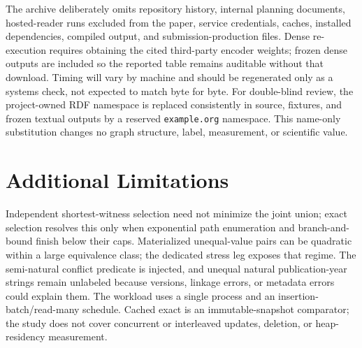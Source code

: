 \documentclass[letterpaper]{article}
\begin{document}
The archive deliberately omits repository history, internal planning
documents, hosted-reader runs excluded from the paper, service credentials,
caches, installed dependencies, compiled output, and submission-production
files.  Dense re-execution requires obtaining the cited third-party encoder
weights; frozen dense outputs are included so the reported table remains
auditable without that download.  Timing will vary by machine and should be
regenerated only as a systems check, not expected to match byte for byte.
For double-blind review, the project-owned RDF namespace is replaced
consistently in source, fixtures, and frozen textual outputs by a reserved
\texttt{example.org} namespace.  This name-only substitution changes no graph
structure, label, measurement, or scientific value.

\section{Additional Limitations}

Independent shortest-witness selection need not minimize the joint union;
exact selection resolves this only when exponential path enumeration and
branch-and-bound finish below their caps.  Materialized unequal-value pairs can
be quadratic within a large equivalence class; the dedicated stress leg
exposes that regime.  The semi-natural conflict predicate is injected, and
unequal natural publication-year strings remain unlabeled because versions,
linkage errors, or metadata errors could explain them.  The workload uses a
single process and an insertion-batch/read-many schedule.  Cached exact is an
immutable-snapshot comparator; the study does not cover concurrent or
interleaved updates, deletion, or heap-residency measurement.
\end{document}
